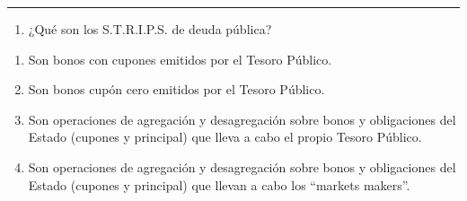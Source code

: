 \documentclass[
  letterpaper,
  DIV=11,
  numbers=noendperiod]{scrartcl}
\providecommand{\tightlist}{%
  \setlength{\itemsep}{0pt}\setlength{\parskip}{0pt}}\usepackage{longtable,booktabs,array}
\begin{document}
\begin{center}\rule{0.5\linewidth}{0.5pt}\end{center}

\begin{enumerate}
\def\labelenumi{\arabic{enumi}.}
\setcounter{enumi}{10}
\tightlist
\item
  ¿Qué son los S.T.R.I.P.S. de deuda pública?
\end{enumerate}

\begin{enumerate}
\def\labelenumi{\alph{enumi}.}
\item
  Son bonos con cupones emitidos por el Tesoro Público.
\item
  Son bonos cupón cero emitidos por el Tesoro Público.
\item
  Son operaciones de agregación y desagregación sobre bonos y
  obligaciones del Estado (cupones y principal) que lleva a cabo el
  propio Tesoro Público.
\item
  Son operaciones de agregación y desagregación sobre bonos y
  obligaciones del Estado (cupones y principal) que llevan a cabo los
  ``markets makers''.
\end{enumerate}
\end{document}
